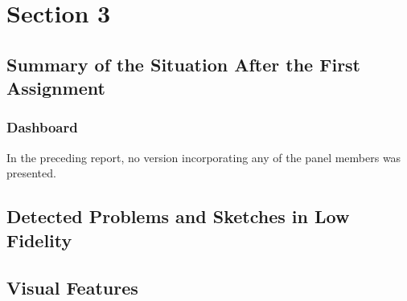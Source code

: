 \chapter{Section 3}
\section{Summary of the Situation After the First Assignment}
\subsection{Dashboard}
In the preceding report, no version incorporating any 
of the panel members was presented. 
\section{Detected Problems and Sketches in Low Fidelity}
\section{Visual Features}
